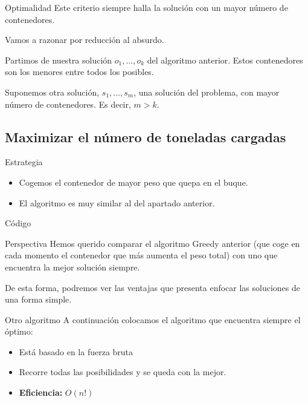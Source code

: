 \begin{frame}{Optimalidad}
Este criterio siempre halla la solución con un mayor número de contenedores.

Vamos a razonar por reducción al absurdo.

\vspace{1cm}
\pause
Partimos de nuestra solución  $o_1, \dots, o_k$ del algoritmo anterior. Estos contenedores son los menores entre todos los posibles.

Suponemos otra solución, $s_1, \dots, s_m$, una solución del problema, con mayor número de contenedores. Es decir, $m > k$.

\end{frame}

\subsection{Maximizar el número de toneladas cargadas}

\begin{frame}{Estrategia}
\begin{itemize}
  \item Cogemos el contenedor de mayor peso que quepa en el buque.
  \item El algoritmo es muy similar al del apartado anterior.
\end{itemize}
\end{frame}

\begin{frame}[fragile]{Código}

\end{frame}

\begin{frame}{Perspectiva}
	Hemos querido comparar el algoritmo Greedy anterior (que coge en cada momento el contenedor que más aumenta el peso total) con uno que encuentra la mejor solución siempre.
	\vspace{1cm}

	De esta forma, podremos ver las ventajas que presenta enfocar las soluciones de una forma simple.
\end{frame}

\begin{frame}{Otro algoritmo}
	A continuación colocamos el algoritmo que encuentra siempre el óptimo:

	\begin{itemize}
		\item Está basado en la fuerza bruta
		\item Recorre todas las posibilidades y se queda con la mejor.
		\item \textbf{Eficiencia:} $O(n!)$
	\end{itemize}
\end{frame}

